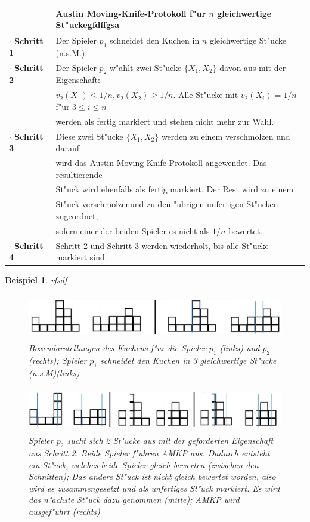 \documentclass[11pt, a4paper, twoside]{article}
\newcommand{\markup}[1]{\uline{#1}}
\let\abk\nomenclature
\newcommand{\wf}{\color{white}}
\newcommand{\tf}{\color{black}}
\newtheorem{bsp}[satz]{Beispiel}
\numberwithin{equation}{section}
\begin{document}
\begin{tabular}{|ll|}
\hline
&\textbf{Austin Moving-Knife-Protokoll f"ur $n$ gleichwertige St"ucke}\wf gfdffgsa\tf\\
\hline
\textbf{$\cdot$ Schritt 1}& Der Spieler $p_1$ schneidet den Kuchen in $n$ gleichwertige St"ucke (n.s.M.)\abk{n.s.M.}{\markup{n}ach \markup{s}einem \markup{M}ass}.\\
\textbf{$\cdot$ Schritt 2}& Der Spieler $p_2$ w"ahlt zwei St"ucke $\{X_1,X_2\}$ davon aus mit der Eigenschaft:\\&$v_2(X_1) \leq 1/n,v_2(X_2) \geq 1/n$. Alle St"ucke mit $v_2(X_i)=1/n$ f"ur $3\leq i \leq n$\\&werden als fertig markiert und stehen nicht mehr zur Wahl.\\
\textbf{$\cdot$ Schritt 3}& Diese zwei St"ucke $\{X_1,X_2\}$ werden zu einem verschmolzen und darauf\\&wird das Austin Moving-Knife-Protokoll angewendet. Das resultierende\\&St"uck wird ebenfalls als fertig markiert. Der Rest wird zu einem\\&St"uck verschmolzenund zu den "ubrigen unfertigen St"ucken zugeordnet,\\&sofern einer der beiden Spieler es nicht als $1/n$ bewertet.\\
\textbf{$\cdot$ Schritt 4}& Schritt 2 und Schritt 3 werden wiederholt, bis alle St"ucke markiert sind.\\
\hline
\end{tabular}
\begin{bsp}\wf rfsdf 
\begin{figure}[h!]
\includegraphics[height=2cm]{cc7.jpg}
\caption[Beispiel zum Austin Moving-Knife-Protokoll f"ur 3 gleichwertige St"ucke 1/2]{Boxendarstellungen des Kuchens f"ur die Spieler $p_1$ (links) und $p_2$ (rechts); Spieler $p_1$ schneidet den Kuchen in 3 gleichwertige St"ucke (n.s.M)(links)}
\end{figure}
\begin{figure}[h!]
\includegraphics[height=2cm]{cc9.jpg}
\caption[Beispiel zum Austin Moving-Knife-Protokoll \abk{AMKP}{\markup{A}ustin \markup{M}oving-\markup{K}nife-\markup{P}rotokoll} f"ur 3 gleichwertige St"ucke 2/2]{Spieler $p_2$ sucht sich 2 St"ucke aus mit der geforderten Eigenschaft aus Schritt 2. Beide Spieler f"uhren AMKP aus. Dadurch entsteht ein St"uck, welches beide Spieler gleich bewerten (zwischen den Schnitten); Das andere St"uck ist nicht gleich bewertet worden, also wird es zusammengesetzt und als unfertiges St"uck markiert. Es wird das n"achste St"uck dazu genommen (mitte); AMKP wird ausgef"uhrt (rechts)}
\end{figure}
\end{bsp}
\end{document}
